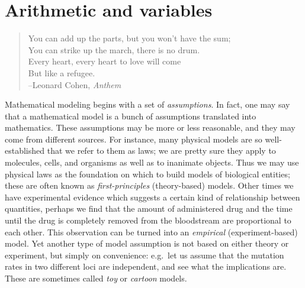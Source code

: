 \documentclass[
  letterpaper,
  DIV=11,
  numbers=noendperiod]{scrreprt}
\begin{document}

\hypertarget{arithmetic-and-variables}{%
\chapter{Arithmetic and variables}\label{arithmetic-and-variables}}

\begin{quote}
You can add up the parts, but you won't have the sum;\\
You can strike up the march, there is no drum.\\
Every heart, every heart to love will come\\
But like a refugee.\\
--Leonard Cohen, \emph{Anthem}
\end{quote}

Mathematical modeling begins with a set of \emph{assumptions}. In fact,
one may say that a mathematical model is a bunch of assumptions
translated into mathematics. These assumptions may be more or less
reasonable, and they may come from different sources. For instance, many
physical models are so well-established that we refer to them as laws;
we are pretty sure they apply to molecules, cells, and organisms as well
as to inanimate objects. Thus we may use physical laws as the foundation
on which to build models of biological entities; these are often known
as \emph{first-principles} (theory-based) models. Other times we have
experimental evidence which suggests a certain kind of relationship
between quantities, perhaps we find that the amount of administered drug
and the time until the drug is completely removed from the bloodstream
are proportional to each other. This observation can be turned into an
\emph{empirical} (experiment-based) model. Yet another type of model
assumption is not based on either theory or experiment, but simply on
convenience: e.g.~let us assume that the mutation rates in two different
loci are independent, and see what the implications are. These are
sometimes called \emph{toy} or \emph{cartoon} models.
\cite{jungck_mathematical_2010}
\end{document}
